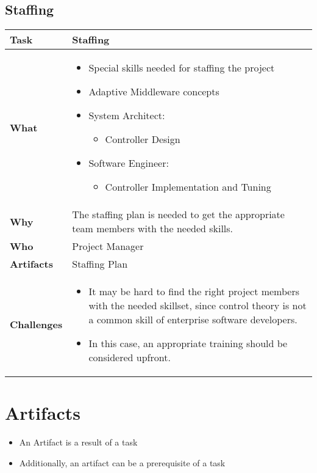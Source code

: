 \subsection{Staffing}
\begin{minipage}{\textwidth}
 \label{table:ch6_Task_Staffing}
\begin{tabular}
	{|m{3cm}|m{10cm}|} \hline \bfseries Task & Staffing\\
	\hline \bfseries What & 
	\begin{itemize}
		\item Special skills needed for staffing the project
		\item Adaptive Middleware concepts
		\item System Architect:
		\begin{itemize}
			\item Controller Design
		\end{itemize}
		\item Software Engineer:
		\begin{itemize}
			\item Controller Implementation and Tuning
		\end{itemize}
	\end{itemize}
	\\
	\hline \bfseries Why & The staffing plan is needed to get the appropriate team members with the needed skills.\\
	\hline \bfseries Who & Project Manager\\
	\hline \bfseries Artifacts & Staffing Plan\\
	\hline \bfseries Challenges &
	\begin{itemize}
		\item It may be hard to find the right project members with the needed skillset, since control theory is not a common skill of enterprise software developers. 
		\item In this case, an appropriate training should be considered upfront.
	\end{itemize}
	\\
	\hline 
\end{tabular}
\end{minipage}

\section{Artifacts}

\begin{itemize}
	\item An Artifact is a result of a task
	\item Additionally, an artifact can be a prerequisite of a task
\end{itemize}

